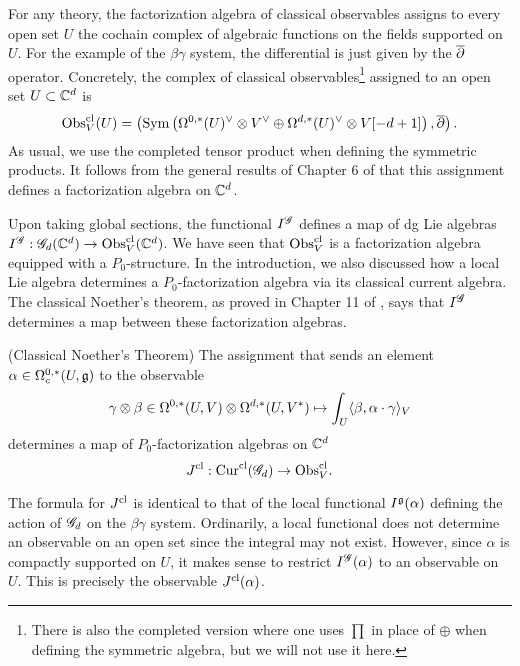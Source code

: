 

For any theory, the factorization algebra of classical observables assigns to every open set $U$ the cochain complex of algebraic functions on the fields supported on $U$.  
For the example of the $\beta\gamma$ system, the differential is just given by the $\overline{\partial}$ operator. 
Concretely, the complex of classical observables\footnote{There is also the completed version where one uses $\prod$ in place of $\oplus$ when defining the symmetric algebra, but we will not use it here.} assigned to an open set $U \subset \mathbb C^d$ is
\[
{\rm Obs}^{{\rm cl}}_V(U) = \left({\rm Sym} \left(\Omega^{0,*}(U)^\vee \otimes V^\vee \oplus \Omega^{d,*}(U)^\vee \otimes V [-d+1]\right), \overline{\partial}\right) .
\]
As usual, we use the completed tensor product when defining the symmetric products. 
It follows from the general results of Chapter 6 of \cite{CG2} that this assignment defines a factorization algebra on $\mathbb C^d$. 

Upon taking global sections, the functional $I^{\mathscr G}$ defines a map of dg Lie algebras $I^{\mathscr G} : \mathscr G_d(\mathbb C^d) \to {\rm Obs}^{{\rm cl}}_V(\mathbb C^d)$.
We have seen that ${\rm Obs}_V^{{\rm cl}}$ is a factorization algebra equipped with a $P_0$-structure. 
In the introduction, we also discussed how a local Lie algebra determines a $P_0$-factorization algebra via its classical current algebra. 
The classical Noether's theorem, as proved in Chapter 11 of \cite{CG2}, says that $I^{\mathscr G}$ determines a map between these factorization algebras. 

\begin{prop}{\cite{[CG2]}} (Classical Noether's Theorem)
The assignment that sends an element $\alpha \in \Omega^{0,*}_c(U, \mathfrak g)$ to the observable
\[
\gamma \otimes \beta \in \Omega^{0,*}(U, V) \otimes \Omega^{d,*}(U, V^*) \mapsto \int_U \langle\beta, \alpha \cdot \gamma\rangle_V
\]
determines a map of $P_0$-factorization algebras on $\mathbb C^d$
\[
J^{{\rm cl}} : {\rm Cur}^{{\rm cl}} (\mathscr G_d) \to {\rm Obs}^{{\rm cl}}_V .
\]
\end{prop}

\begin{rmk}
The formula for $J^{{\rm cl}}$ is identical to that of the local functional $I^\mathfrak g(\alpha)$ defining the action of $\mathscr G_d$ on the $\beta\gamma$ system.
Ordinarily, a local functional does not determine an observable on an open set since the integral may not exist.
However, since $\alpha$ is compactly supported on $U$, it makes sense to restrict $I^\mathscr G (\alpha)$ to an observable on $U$. 
This is precisely the observable $J^{{\rm cl}}(\alpha)$. 
\end{rmk}

